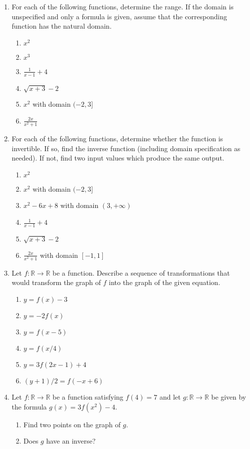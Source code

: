 \begin{enumerate}
\begin{enumerate}
\end{enumerate}
\item For each of the following functions, determine the range. If the domain is unspecified and only a formula is given, assume that the corresponding function has the natural domain.
\begin{enumerate}
\item $x^2$
\item $x^3$
\item $\frac{1}{x - 1} + 4$
\item $\sqrt{x + 3} - 2$
\item $x^2$ with domain $(-2,3]$
\item $\frac{2x}{x^2 + 1}$
\end{enumerate}
\item For each of the following functions, determine whether the function is invertible. If so, find the inverse function (including domain specification as needed). If not, find two input values which produce the same output.
\begin{enumerate}
\item $x^2$
\item $x^2$ with domain $(-2,3]$
\item $x^2 - 6x + 8$ with domain $(3, +\infty)$
\item $\frac{1}{x - 1} + 4$
\item $\sqrt{x + 3} - 2$
\item $\frac{2x}{x^2 + 1}$ with domain $[-1,1]$
\end{enumerate}
\item Let $f:\mathbb{R}\to\mathbb{R}$ be a function. Describe a sequence of transformations that would transform the graph of $f$ into the graph of the given equation.
\begin{enumerate}
\item $y = f(x) - 3$
\item $y = -2f(x)$
\item $y = f(x - 5)$
\item $y = f(x/4)$
\item $y = 3f(2x - 1) + 4$
\item $(y + 1)/2 = f(-x + 6)$
\end{enumerate}
\item Let $f:\mathbb{R}\to\mathbb{R}$ be a function satisfying $f(4) = 7$ and let $g:\mathbb{R}\to\mathbb{R}$ be given by the formula $g(x) = 3f(x^2) - 4$.
\begin{enumerate}
\item Find two points on the graph of $g$.
\item Does $g$ have an inverse?
\end{enumerate}
\end{enumerate}


